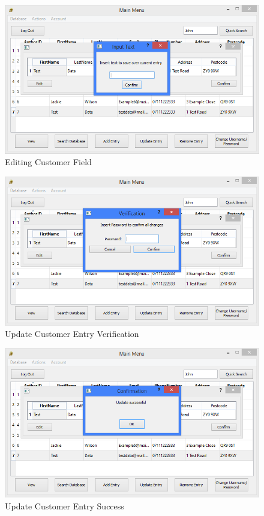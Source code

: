 \begin{figure}[H]
    \caption{Editing Customer Field} \label{fig:EditingEntry}
    \includegraphics[width=\textwidth]{./Maintenance/UserInterface/EditingEntry.png}
\end{figure}

\begin{figure}[H]
    \caption{Update Customer Entry Verification} \label{fig:UpdateEntryVerify}
    \includegraphics[width=\textwidth]{./Maintenance/UserInterface/UpdateEntryVerify.png}
\end{figure}

\begin{figure}[H]
    \caption{Update Customer Entry Success} \label{fig:UpdateEntrySuccess}
    \includegraphics[width=\textwidth]{./Maintenance/UserInterface/UpdateEntrySuccess.png}
\end{figure}

